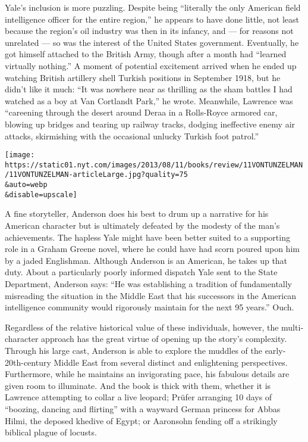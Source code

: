 Yale's inclusion is more puzzling. Despite being ``literally the only
American field intelligence officer for the entire region,'' he appears
to have done little, not least because the region's oil industry was
then in its infancy, and --- for reasons not unrelated --- so was the
interest of the United States government. Eventually, he got himself
attached to the British Army, though after a month had ``learned
virtually nothing.'' A moment of potential excitement arrived when he
ended up watching British artillery shell Turkish positions in September
1918, but he didn't like it much: ``It was nowhere near as thrilling as
the sham battles I had watched as a boy at Van Cortlandt Park,'' he
wrote. Meanwhile, Lawrence was ``careening through the desert around
Deraa in a Rolls-Royce armored car, blowing up bridges and tearing up
railway tracks, dodging ineffective enemy air attacks, skirmishing with
the occasional unlucky Turkish foot patrol.''

\texttt{[image: https://static01.nyt.com/images/2013/08/11/books/review/11VONTUNZELMAN/11VONTUNZELMAN-articleLarge.jpg?quality=75\\\&auto=webp\\\&disable=upscale]}

A fine storyteller, Anderson does his best to drum up a narrative for
his American character but is ultimately defeated by the modesty of the
man's achievements. The hapless Yale might have been better suited to a
supporting role in a Graham Greene novel, where he could have had scorn
poured upon him by a jaded Englishman. Although Anderson is an American,
he takes up that duty. About a particularly poorly informed dispatch
Yale sent to the State Department, Anderson says: ``He was establishing
a tradition of fundamentally misreading the situation in the Middle East
that his successors in the American intelligence community would
rigorously maintain for the next 95 years.'' Ouch.

Regardless of the relative historical value of these individuals,
however, the multi­character approach has the great virtue of opening up
the story's complexity. Through his large cast, Anderson is able to
explore the muddles of the early-20th-century Middle East from several
distinct and enlightening perspectives. Furthermore, while he maintains
an invigorating pace, his fabulous details are given room to illuminate.
And the book is thick with them, whether it is Lawrence attempting to
collar a live leopard; Prüfer arranging 10 days of ``boozing, dancing
and flirting'' with a wayward German princess for Abbas Hilmi, the
deposed khedive of Egypt; or Aaronsohn fending off a strikingly biblical
plague of locusts.

